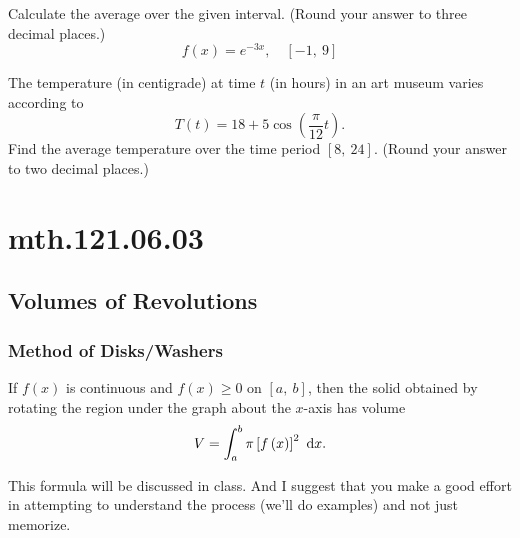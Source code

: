 \documentclass[12pt,addpoints, answers, fleqn]{exam}
\begin{document}
\begin{teacher}
\begin{questions}
\question 	%

Calculate the average over the given interval. (Round your answer to three decimal places.)
\[
f\left(x\right) = e^{-3x}, \quad      \left[ -1, \ 9 \right]
\]

\begin{solution}
\end{solution}

\question 	%

The temperature (in centigrade) at time $t$ (in hours) in an art museum varies according to
\[
T\left(t\right) = 18 + 5 \cos \left( \frac{\pi }{12} t \right).
\]
Find the average temperature over the time period $\left[8, \ 24\right]$. (Round your answer to two decimal places.)

\begin{solution}
\end{solution}

\end{questions}
\end{teacher}
\vfill
\pagebreak


\section{mth.121.06.03}
\subsection{Volumes of Revolutions}

\subsubsection{Method of Disks/Washers}

If $f \left(x\right)$ is continuous and $f \left(x\right) \geq 0$ on $\left[ a, \ b \right]$, then the solid obtained by rotating the region under the graph about the $x$-axis has volume
\[
V = \int_a^b \pi \left[  f \left(x\right)  \right]^2 \ {\rm{d}} x.
\]

This formula will be discussed in class. And I suggest that you make a good effort in attempting to understand the process (we'll do examples) and not just memorize.
\end{document}
